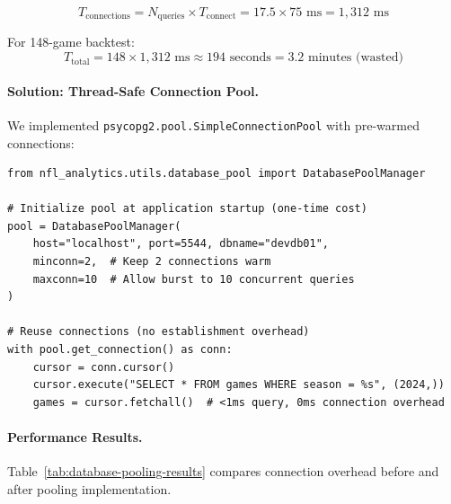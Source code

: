 \begin{equation}
T_{\text{connections}} = N_{\text{queries}} \times T_{\text{connect}} = 17.5 \times 75 \text{ ms} = 1,312 \text{ ms}
\end{equation}

For 148-game backtest:
\begin{equation}
T_{\text{total}} = 148 \times 1,312 \text{ ms} \approx 194 \text{ seconds} = 3.2 \text{ minutes (wasted)}
\end{equation}

\paragraph{Solution: Thread-Safe Connection Pool.}
We implemented \texttt{psycopg2.pool.SimpleConnectionPool} with pre-warmed connections:

\begin{verbatim}
from nfl_analytics.utils.database_pool import DatabasePoolManager

# Initialize pool at application startup (one-time cost)
pool = DatabasePoolManager(
    host="localhost", port=5544, dbname="devdb01",
    minconn=2,  # Keep 2 connections warm
    maxconn=10  # Allow burst to 10 concurrent queries
)

# Reuse connections (no establishment overhead)
with pool.get_connection() as conn:
    cursor = conn.cursor()
    cursor.execute("SELECT * FROM games WHERE season = %s", (2024,))
    games = cursor.fetchall()  # <1ms query, 0ms connection overhead
\end{verbatim}

\paragraph{Performance Results.}

Table~\ref{tab:database-pooling-results} compares connection overhead before and after pooling implementation.

